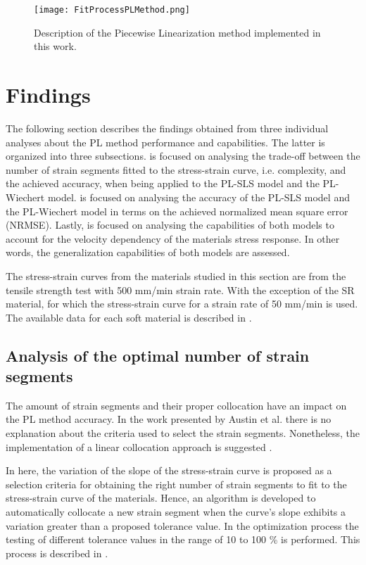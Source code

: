\begin{figure}[H]
	\centering
	\texttt{[image: FitProcessPLMethod.png]}
	\caption{ Description of the Piecewise Linearization method implemented in this work.}
	\label{fig:FCFittingProcess}
\end{figure}

\newpage

\section{Findings}

The following section describes the findings obtained from three individual analyses about the PL method performance and capabilities. The latter is organized into three subsections.  is focused on analysing the trade-off between the number of strain segments fitted to the stress-strain curve, i.e. complexity, and the achieved accuracy, when being applied to the PL-SLS model and the PL-Wiechert model.  is focused on analysing the accuracy of the PL-SLS model and the PL-Wiechert model in terms on the achieved normalized mean square error (NRMSE). Lastly,  is focused on analysing the capabilities of both models to account for the velocity dependency of the materials stress response. In other words, the generalization capabilities of both models are assessed.

The stress-strain curves from the materials studied in this section are from the tensile strength test with 500 mm/min strain rate. With the exception of the SR material, for which the stress-strain curve for a strain rate of 50 mm/min is used. The available data for each soft material is described in .

\subsection{Analysis of the optimal number of strain segments} \label{SegmentAnalysis}

The amount of strain segments and their proper collocation have an impact on the PL method accuracy. In the work presented by Austin et al. there is no explanation about the criteria used to select the strain segments. Nonetheless, the implementation of a linear collocation approach is suggested \cite{austin2015control}. 

In here, the variation of the slope of the stress-strain curve is proposed as a selection criteria for obtaining the right number of strain segments to fit to the stress-strain curve of the materials. Hence, an algorithm is developed to automatically collocate a new strain segment when the curve's slope exhibits a variation greater than a proposed tolerance value. In the optimization process the testing of different tolerance values in the range of 10 to 100 \% is performed. This process is described in . 

